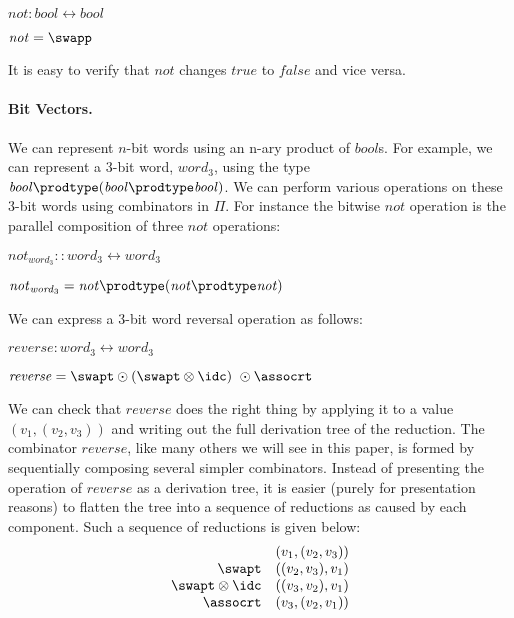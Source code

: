\ensuremath{\mathit{not} : \mathit{bool} \leftrightarrow \mathit{bool}}

\ensuremath{\mathit{not} = \swapp}

\noindent
It is easy to verify that \ensuremath{\mathit{not}} changes \ensuremath{\mathit{true}} to \ensuremath{\mathit{false}} and
vice versa.

\paragraph*{Bit Vectors.}
We can represent $n$-bit words using an n-ary product of
\ensuremath{\mathit{bool}}s. For example, we can represent a 3-bit word, \ensuremath{\mathit{word}_3},
using the type \ensuremath{\mathit{bool} {\prodtype} (\mathit{bool} {\prodtype}  \mathit{bool})}.  We can perform various
operations on these 3-bit words using combinators in \ensuremath{\Pi }. For
instance the bitwise \ensuremath{\mathit{not}} operation is the parallel composition of
three \ensuremath{\mathit{not}} operations:

\ensuremath{\mathit{not}_{\mathit{word}_3} :: \mathit{word}_3 \leftrightarrow \mathit{word}_3}

\ensuremath{\mathit{not}_{\mathit{word}_3} = \mathit{not}  {\prodtype}  (\mathit{not}  {\prodtype}  \mathit{not})}

\noindent We can express a 3-bit word reversal operation as follows:

\ensuremath{\mathit{reverse} : \mathit{word}_3 \leftrightarrow \mathit{word}_3}

\ensuremath{\mathit{reverse} = \swapt \odot (\swapt  \otimes  \idc)~ \odot \assocrt}

\noindent We can check that \ensuremath{\mathit{reverse}} does the right thing by
applying it to a value \ensuremath{(v_1, (v_2, v_3))} and writing out the full
derivation tree of the reduction.  The combinator \ensuremath{\mathit{reverse}}, like
many others we will see in this paper, is formed by sequentially
composing several simpler combinators. Instead of presenting the
operation of \ensuremath{\mathit{reverse}} as a derivation tree, it is easier (purely
for presentation reasons) to flatten the tree into a sequence of
reductions as caused by each component. Such a sequence of reductions
is given below:
\[\begin{array}{rlr}
 & (v_1, (v_2, v_3)) \\
 \swapt & ((v_2, v_3), v_1) \\
 \swapt \otimes  \idc & ((v_3, v_2), v_1) \\
 \assocrt & (v_3, (v_2, v_1)) \\
 \end{array}\]

